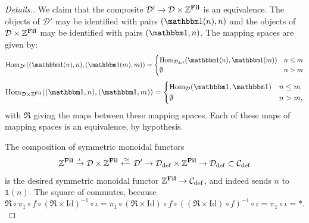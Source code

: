 \begin{proof}[Details.]
  We claim that the composite $\mathcal{D}' \to \mathcal{D} \times \mathbb{Z}^{\operatorname{\mathbf{Fil}}}$ is an equivalence.
  The objects of $\mathcal{D}'$ may be identified with pairs $(\o(n),n)$ and the objects of $\mathcal{D} \times \mathbb{Z}^{\operatorname{\mathbf{Fil}}}$ may be identified with pairs $(\o, n)$. %
  The mapping spaces are given by:
  \[ \Hom_{\mathcal{D}'}((\o(n),n), (\o(m),m)) = \begin{cases} \Hom_{\mathcal{D}_{\mathrm{def}}}(\o(n),\o(m)) & n \leq m \\ \emptyset & n > m \end{cases} \]
  \[ \Hom_{\mathcal{D}\times \Z^{\Fil}} ((\o,n), (\o,m)) = \begin{cases} \Hom_{\mathcal{D}}(\o,\o) & n \leq m \\ \emptyset & n > m, \end{cases} \]
  with $\Re$ giving the maps between these mapping spaces.  Each of these maps of mapping spaces is an equivalence, by hypothesis.

  The composition of symmetric monoidal functors
  \[ \mathbb{Z}^{\operatorname{\mathbf{Fil}}} \xrightarrow{\iota} \mathcal{D} \times \mathbb{Z}^{\operatorname{\mathbf{Fil}}} \xleftarrow{\simeq} \mathcal{D}' \to \mathcal{D}_{\mathrm{def}} \times \mathbb{Z}^{\operatorname{\mathbf{Fil}}} \to \mathcal{D}_{\mathrm{def}} \subset \mathcal{C}_{\mathrm{def}} \]
  is the desired symmetric monoidal functor $\mathbb{Z}^{\operatorname{\mathbf{Fil}}} \to \mathcal{C}_{\mathrm{def}}$, and indeed sends $n$ to $\mathbb{1}(n)$.
  The square of  commutes, because
  \[ \Re \circ \pi_1 \circ f \circ (\Re \times \mathrm{Id})^{-1} \circ \iota = \pi_1 \circ (\Re \times \mathrm{Id}) \circ f \circ ((\Re \times \mathrm{Id}) \circ f)^{-1} \circ \iota = \pi_1 \circ \iota = * .\] \qedhere

\end{proof}


